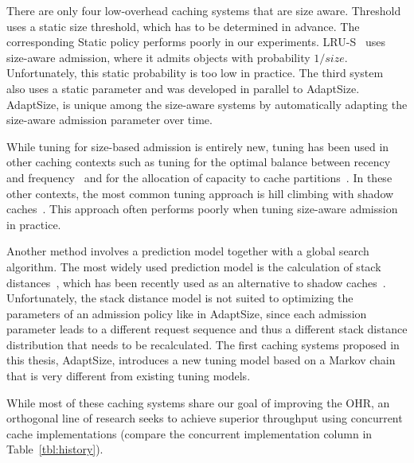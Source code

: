 \documentclass{article}
\begin{document}
There are only four low-overhead caching systems that are size aware.
Threshold~\cite{abrams1995} uses a static size threshold, which has to be determined in advance.
The corresponding Static policy performs poorly in our experiments.
LRU-S~\cite{starobinski2001probabilistic} uses size-aware admission, where it admits objects with probability $1/size$.
Unfortunately, this static probability is too low in practice.
The third system~\cite{neglia2016access} also uses a static parameter and was developed in parallel to AdaptSize.
AdaptSize, is unique among the size-aware systems by automatically adapting the size-aware admission parameter over time.

While tuning for size-based admission is entirely new, tuning has been used in other caching contexts such as tuning for the optimal balance between recency and frequency~\cite{johnson19942q,megiddo2003arc,lee1999existence,jiang2002lirs,zhou2001multi,bansal2004car,berger2015maximizing} and for the allocation of capacity to cache partitions~\cite{cidon2016cliffhanger,hu2015lama,cidon2015dynacache,saemundsson2014dynamic}.
In these other contexts, the most common tuning approach is hill climbing with shadow caches~\cite{johnson19942q,megiddo2003arc,lee1999existence,jiang2002lirs,zhou2001multi,bansal2004car,cidon2016cliffhanger}.
This approach often performs poorly when tuning size-aware admission in practice.

Another method involves a prediction model together with a global search algorithm.
The most widely used prediction model is the calculation of stack distances~\cite{mattson1970evaluation,almasi2002calculating,wires2014characterizing,waldspurger2015efficient}, which has been recently used as an alternative to shadow caches~\cite{saemundsson2014dynamic,cidon2015dynacache,saemundsson2014dynamic}.
Unfortunately, the stack distance model is not suited to optimizing the parameters of an admission policy like in AdaptSize, since each admission parameter leads to a different request sequence and thus a different stack distance distribution that needs to be recalculated.
The first caching systems proposed in this thesis, AdaptSize, introduces a new tuning model based on a Markov chain that is very different from existing tuning models.

While most of these caching systems share our goal of improving the OHR, an orthogonal line of research seeks to achieve superior throughput using concurrent cache implementations (compare the concurrent implementation column in Table~\ref{tbl:history}).
\end{document}
